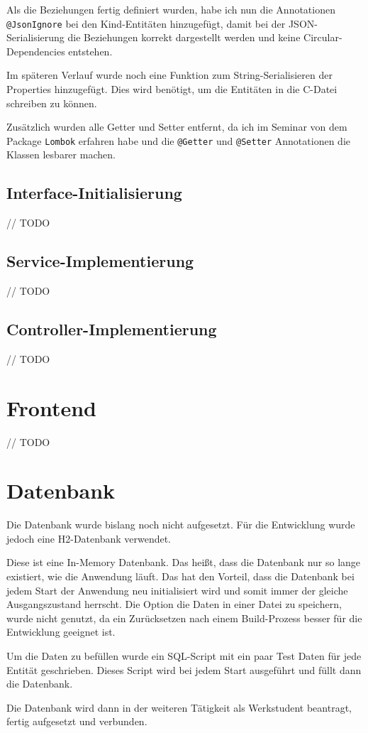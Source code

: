 Als die Beziehungen fertig definiert wurden, habe ich nun die Annotationen \texttt{@JsonIgnore} bei den Kind-Entitäten hinzugefügt, damit bei 
der JSON-Serialisierung die Beziehungen korrekt dargestellt werden und keine Circular-Dependencies entstehen.

Im späteren Verlauf wurde noch eine Funktion zum String-Serialisieren der Properties hinzugefügt. Dies wird benötigt, um die Entitäten in die C-Datei schreiben zu können.

Zusätzlich wurden alle Getter und Setter entfernt, da ich im Seminar von dem Package \texttt{Lombok} erfahren habe und 
die \texttt{@Getter} und \texttt{@Setter} Annotationen die Klassen lesbarer machen.

\subsection{Interface-Initialisierung}
// TODO
\subsection{Service-Implementierung}
// TODO
\subsection{Controller-Implementierung}
// TODO
\section{Frontend}
// TODO
\section{Datenbank}
Die Datenbank wurde bislang noch nicht aufgesetzt. Für die Entwicklung wurde jedoch eine H2-Datenbank verwendet. 

Diese ist eine In-Memory Datenbank. Das heißt, dass die Datenbank nur so lange existiert, wie die Anwendung läuft.
Das hat den Vorteil, dass die Datenbank bei jedem Start der Anwendung neu initialisiert wird und somit immer der gleiche Ausgangszustand herrscht.
Die Option die Daten in einer Datei zu speichern, wurde nicht genutzt, da ein Zurücksetzen nach einem Build-Prozess besser für die Entwicklung geeignet ist.

Um die Daten zu befüllen wurde ein SQL-Script mit ein paar Test Daten für jede Entität geschrieben. Dieses Script wird bei jedem Start ausgeführt und
füllt dann die Datenbank.

Die Datenbank wird dann in der weiteren Tätigkeit als Werkstudent beantragt, fertig aufgesetzt und verbunden.
\
